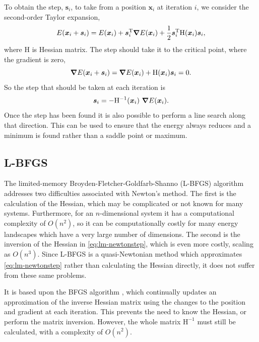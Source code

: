To obtain the step, $\bm{s}_i$, to take from a position $\bm{x}_i$ at iteration $i$, we consider the second-order Taylor expansion,
\begin{equation}
  E(\bm{x}_i + \bm{s}_i) = E(\bm{x}_i) +  \bm{s}_i^\mathrm{T} \bm{\nabla} E(\bm{x}_i) + \frac{1}{2} \bm{s}_i^\mathrm{T} \mathrm{H}(\bm{x}_i) \bm{s}_i,
\end{equation}
where $\mathrm{H}$ is Hessian matrix.
The step should take it to the critical point, where the gradient is zero,
\begin{equation}
  \bm{\nabla} E(\bm{x}_i + \bm{s}_i) = \bm{\nabla} E(\bm{x}_i) + \mathrm{H}(\bm{x}_i) \bm{s}_i = 0.
\end{equation}
So the step that should be taken at each iteration is
\begin{equation}
  \bm{s}_i = - \mathrm{H}^{-1}(\bm{x}_i) \  \bm{\nabla} E(\bm{x}_i).
  \label{eq:lm-newtonstep}
\end{equation}
Once the step has been found it is also possible to perform a line search along that direction.
This can be used to ensure that the energy always reduces and a minimum is found rather than a saddle point or maximum.


\subsection{L-BFGS}
The limited-memory Broyden-Fletcher-Goldfarb-Shanno (L-BFGS) algorithm \cite{Nocedal1980,Liu1989} addresses two difficulties associated with Newton's method.
The first is the calculation of the Hessian, which may be complicated or not known for many systems.
Furthermore, for an $n$-dimensional system it has a computational complexity of $O(n^2)$, so it can be computationally costly for many energy landscapes which have a very large number of dimensions.
The second is the inversion of the Hessian in \cref{eq:lm-newtonstep}, which is even more costly, scaling as $O(n^3)$.
Since L-BFGS is a quasi-Newtonian method which approximates \cref{eq:lm-newtonstep} rather than calculating the Hessian directly, it does not suffer from these same problems.

It is based upon the BFGS algorithm \cite{Fletcher1987}, which continually updates an approximation of the inverse Hessian matrix using the changes to the position and gradient at each iteration.
This prevents the need to know the Hessian, or perform the matrix inversion.
However, the whole matrix $\mathrm{H}^{-1}$ must still be calculated, with a complexity of $O(n^2)$.

